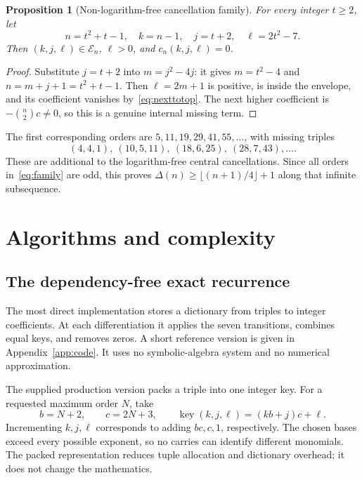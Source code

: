 \documentclass[11pt]{article}
\numberwithin{equation}{section}
\newtheorem{proposition}[theorem]{Proposition}
\theoremstyle{definition}
\theoremstyle{remark}
\begin{document}
\begin{proposition}[Non-logarithm-free cancellation family]\label{prop:family}
For every integer $t\ge2$, let
\begin{equation}\label{eq:family}
 n=t^2+t-1,\quad k=n-1,\quad j=t+2,\quad \ell=2t^2-7.
\end{equation}
Then $(k,j,\ell)\in\mathcal E_n$, $\ell>0$, and
$c_n(k,j,\ell)=0$.
\end{proposition}
\begin{proof}
Substitute $j=t+2$ into $m=j^2-4j$: it gives $m=t^2-4$ and
$n=m+j+1=t^2+t-1$. Then $\ell=2m+1$ is positive, is inside the envelope,
and its coefficient vanishes by~\eqref{eq:nexttotop}. The next higher
coefficient is $-\binom n2c\ne0$, so this is a genuine internal missing term.
\end{proof}

The first corresponding orders are $5,11,19,29,41,55,\ldots$, with missing
triples
\[
 (4,4,1),\ (10,5,11),\ (18,6,25),\ (28,7,43),\ldots.
\]
These are additional to the logarithm-free central cancellations. Since all
orders in~\eqref{eq:family} are odd, this proves
$\Delta(n)\ge\lfloor(n+1)/4\rfloor+1$ along that infinite subsequence.

\section{Algorithms and complexity}

\subsection{The dependency-free exact recurrence}

The most direct implementation stores a dictionary from triples to integer
coefficients. At each differentiation it applies the seven transitions,
combines equal keys, and removes zeros. A short reference version is given
in Appendix~\ref{app:code}. It uses no symbolic-algebra system and no
numerical approximation.

The supplied production version packs a triple into one integer key. For a
requested maximum order $N$, take
\[
 b=N+2,\qquad c=2N+3,\qquad \operatorname{key}(k,j,\ell)=(kb+j)c+\ell.
\]
Incrementing $k,j,\ell$ corresponds to adding $bc,c,1$, respectively. The
chosen bases exceed every possible exponent, so no carries can identify
different monomials. The packed representation reduces tuple allocation
and dictionary overhead; it does not change the mathematics.
\end{document}
